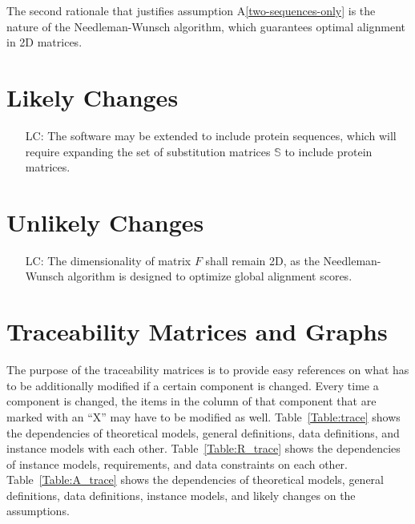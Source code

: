 \documentclass[12pt]{article}
\newcommand{\aref}[1]{A\ref{#1}}
\newcounter{lcnum} %
\begin{document}
The second rationale that justifies assumption \aref{two-sequences-only} is the
nature of the Needleman-Wunsch algorithm, which guarantees optimal alignment in 2D matrices.

\section{Likely Changes}    

\noindent \begin{itemize}

\item[LC\refstepcounter{lcnum}\thelcnum\label{LC_expand_matrices}:]
The software may be extended to include protein sequences, which will require
expanding the set of substitution matrices $\mathbb{S}$ to include protein matrices.

\end{itemize}

\section{Unlikely Changes}    

\noindent \begin{itemize}

\item[LC\refstepcounter{lcnum}\thelcnum\label{LC_keep_optimization_global}:] 
The dimensionality of matrix $F$ shall remain 2D, as the Needleman-Wunsch algorithm
is designed to optimize global alignment scores.

\end{itemize}

\section{Traceability Matrices and Graphs}

The purpose of the traceability matrices is to provide easy references on what
has to be additionally modified if a certain component is changed.  Every time a
component is changed, the items in the column of that component that are marked
with an ``X'' may have to be modified as well.  Table~\ref{Table:trace} shows the
dependencies of theoretical models, general definitions, data definitions, and
instance models with each other. Table~\ref{Table:R_trace} shows the
dependencies of instance models, requirements, and data constraints on each
other. Table~\ref{Table:A_trace} shows the dependencies of theoretical models,
general definitions, data definitions, instance models, and likely changes on
the assumptions.
\end{document}
